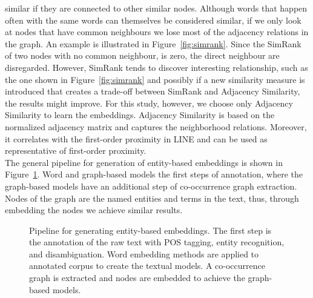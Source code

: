 similar if they are connected to other similar nodes. Although words that happen often with the same words can themselves be considered similar, if we only look at nodes that have common neighbours we lose most of the adjacency relations in the graph. An example is illustrated in Figure~\ref{fig:simrank}. Since the SimRank of two nodes with no common neighbour, is zero, the direct neighbour are disregarded. However, SimRank tends to discover interesting relationship, such as the one shown in Figure~\ref{fig:simrank} and possibly if a new similarity measure is introduced that creates a trade-off between SimRank and Adjacency Similarity, the results might improve. For this study, however, we choose only Adjacency Similarity to learn the embeddings. Adjacency Similarity is based on the normalized adjacency matrix and captures the neighborhood relations. Moreover, it correlates with the first-order proximity in LINE and can be used as representative of first-order proximity. \\
The general pipeline for generation of entity-based embeddings is shown in Figure~\ref{fig:entity_emebddings_pipline}. Word and graph-based models the first steps of annotation, where the graph-based models have an additional step of co-occurrence graph extraction. Nodes of the graph are the named entities and terms in the text, thus, through embedding the nodes we achieve similar results. 
\begin{figure}
\centering 
\resizebox{0.97\textwidth}{0.32\textwidth}{      

}
\caption{Pipeline for generating entity-based embeddings. The first step is the annotation of the raw text with POS tagging, entity recognition, and disambiguation. Word embedding methods are applied to annotated corpus to create the textual models. A co-occurrence graph is extracted and nodes are embedded to achieve the graph-based models.   }
\label{fig:entity_emebddings_pipline}
\end{figure}
